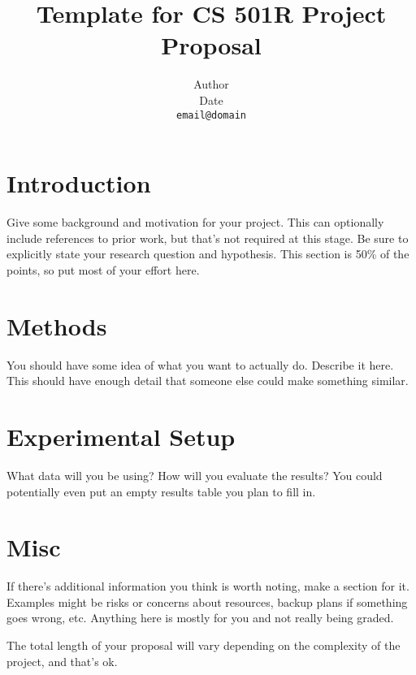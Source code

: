 \documentclass[11pt]{article}
\title{Template for CS 501R Project Proposal}
\author{Author\\
  Date\\
  {\tt email@domain}}
\date{}
\begin{document}
\maketitle

\section{Introduction}

Give some background and motivation for your project. This can optionally include references to prior work, but that's not required at this stage. Be sure to explicitly state your research question and hypothesis. This section is 50\% of the points, so put most of your effort here.

\section{Methods}

You should have some idea of what you want to actually do. Describe it here. This should have enough detail that someone else could make something similar. 

\section{Experimental Setup}

What data will you be using? How will you evaluate the results? You could potentially even put an empty results table you plan to fill in. 

\section{Misc}

If there's additional information you think is worth noting, make a section for it. Examples might be risks or concerns about resources, backup plans if something goes wrong, etc. Anything here is mostly for you and not really being graded.

The total length of your proposal will vary depending on the complexity of the project, and that's ok. 
\end{document}
